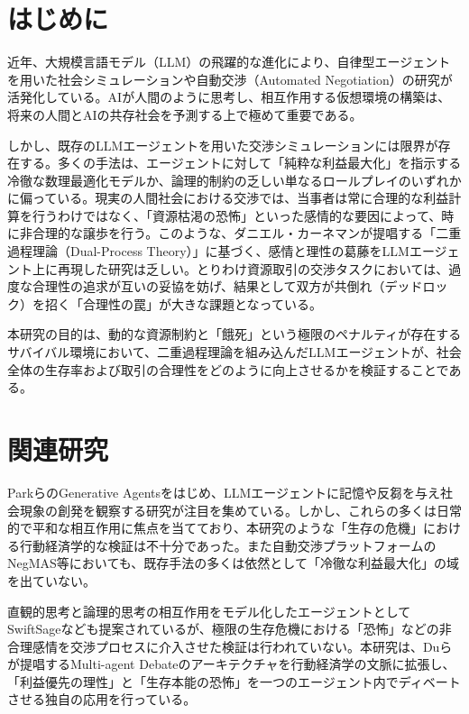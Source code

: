 \documentclass[11pt,a4paper]{ltjsarticle}
\begin{document}
\section{はじめに}
近年、大規模言語モデル（LLM）の飛躍的な進化により、自律型エージェントを用いた社会シミュレーションや自動交渉（Automated Negotiation）の研究が活発化している。AIが人間のように思考し、相互作用する仮想環境の構築は、将来の人間とAIの共存社会を予測する上で極めて重要である。

しかし、既存のLLMエージェントを用いた交渉シミュレーションには限界が存在する。多くの手法は、エージェントに対して「純粋な利益最大化」を指示する冷徹な数理最適化モデルか、論理的制約の乏しい単なるロールプレイのいずれかに偏っている。現実の人間社会における交渉では、当事者は常に合理的な利益計算を行うわけではなく、「資源枯渇の恐怖」といった感情的な要因によって、時に非合理的な譲歩を行う。このような、ダニエル・カーネマンが提唱する「二重過程理論（Dual-Process Theory）」に基づく、感情と理性の葛藤をLLMエージェント上に再現した研究は乏しい。とりわけ資源取引の交渉タスクにおいては、過度な合理性の追求が互いの妥協を妨げ、結果として双方が共倒れ（デッドロック）を招く「合理性の罠」が大きな課題となっている。

本研究の目的は、動的な資源制約と「餓死」という極限のペナルティが存在するサバイバル環境において、二重過程理論を組み込んだLLMエージェントが、社会全体の生存率および取引の合理性をどのように向上させるかを検証することである。

\section{関連研究}
Parkら\cite{generative_agents}のGenerative Agentsをはじめ、LLMエージェントに記憶や反芻を与え社会現象の創発を観察する研究が注目を集めている。しかし、これらの多くは日常的で平和な相互作用に焦点を当てており、本研究のような「生存の危機」における行動経済学的な検証は不十分であった。また自動交渉プラットフォームのNegMAS\cite{negmas}等においても、既存手法の多くは依然として「冷徹な利益最大化」の域を出ていない。

直観的思考と論理的思考の相互作用をモデル化したエージェントとしてSwiftSage\cite{swiftsage}なども提案されているが、極限の生存危機における「恐怖」などの非合理感情を交渉プロセスに介入させた検証は行われていない。本研究は、Duら\cite{multiagent_debate}が提唱するMulti-agent Debateのアーキテクチャを行動経済学の文脈に拡張し、「利益優先の理性」と「生存本能の恐怖」を一つのエージェント内でディベートさせる独自の応用を行っている。
\end{document}
